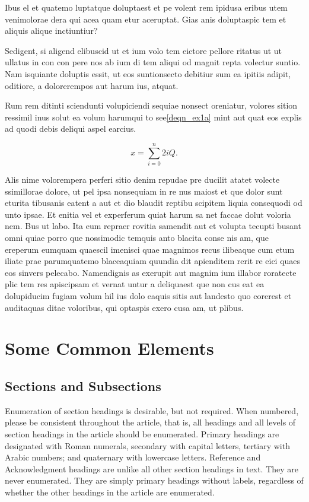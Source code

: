 \documentclass[lettersize,journal]{IEEEtran}
\begin{document}
Ibus el et quatemo luptatque doluptaest et pe volent rem ipidusa eribus utem venimolorae dera qui acea quam etur aceruptat.
Gias anis doluptaspic tem et aliquis alique inctiuntiur?

Sedigent, si aligend elibuscid ut et ium volo tem eictore pellore ritatus ut ut ullatus in con con pere nos ab ium di tem aliqui od magnit repta volectur suntio. Nam isquiante doluptis essit, ut eos suntionsecto debitiur sum ea ipitiis adipit, oditiore, a dolorerempos aut harum ius, atquat.

Rum rem ditinti sciendunti volupiciendi sequiae nonsect oreniatur, volores sition ressimil inus solut ea volum harumqui to see\eqref{deqn_ex1a} mint aut quat eos explis ad quodi debis deliqui aspel earcius.

\begin{equation}
\label{deqn_ex1a}
x = \sum_{i=0}^{n} 2{i} Q.
\end{equation}

Alis nime volorempera perferi sitio denim repudae pre ducilit atatet volecte ssimillorae dolore, ut pel ipsa nonsequiam in re nus maiost et que dolor sunt eturita tibusanis eatent a aut et dio blaudit reptibu scipitem liquia consequodi od unto ipsae. Et enitia vel et experferum quiat harum sa net faccae dolut voloria nem. Bus ut labo. Ita eum repraer rovitia samendit aut et volupta tecupti busant omni quiae porro que nossimodic temquis anto blacita conse nis am, que ereperum eumquam quaescil imenisci quae magnimos recus ilibeaque cum etum iliate prae parumquatemo blaceaquiam quundia dit apienditem rerit re eici quaes eos sinvers pelecabo. Namendignis as exerupit aut magnim ium illabor roratecte plic tem res apiscipsam et vernat untur a deliquaest que non cus eat ea dolupiducim fugiam volum hil ius dolo eaquis sitis aut landesto quo corerest et auditaquas ditae voloribus, qui optaspis exero cusa am, ut plibus.


\section{Some Common Elements}
\subsection{Sections and Subsections}
Enumeration of section headings is desirable, but not required. When numbered, please be consistent throughout the article, that is, all headings and all levels of section headings in the article should be enumerated. Primary headings are designated with Roman numerals, secondary with capital letters, tertiary with Arabic numbers; and quaternary with lowercase letters. Reference and Acknowledgment headings are unlike all other section headings in text. They are never enumerated. They are simply primary headings without labels, regardless of whether the other headings in the article are enumerated. 
\end{document}
